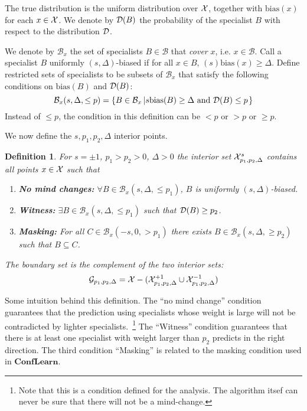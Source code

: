 \documentclass{article}
\newtheorem{definition}[theorem]{Definition}
\newcommand{\D}{{\cal D}}
\newcommand{\cB}{\mathcal{B}}
\newcommand{\cG}{\mathcal{G}}
\newcommand{\bias}{\text{bias}}
\newcommand{\ActiveLearn}{\mathbf{ConfLearn}}
\begin{document}
The true distribution is the uniform distribution over
${\cal X}$, together with $\bias(x)$ for each $x \in {\cal X}$. We denote by
$\D(B)$ the probability of the specialist $B$ with respect to the	
distribution $\D$.

\newcommand{\restricted}[2]{{#1}(#2)}

We denote by $\cB_x$ the set of specialists $B \in \cB$ that {\em
  cover} $x$, i.e. $x \in \cB$.
Call a specialist $B$ uniformly $(s,\Delta)$-biased if for all $x \in B$, $(s)\bias(x) \geq \Delta$.
Define restricted sets of specialists to be subsets of $\cB_x$ that
satisfy the following conditions on $\bias(B)$ and $\D(B)$:
\[ \restricted{\cB_x}{s,\Delta,\leq p}
=
\left\{
B \in \cB_{x} \left| s \bias(B) \geq \Delta \mbox{ and } \D(B) \leq p
\right.\right\}
\]
Instead of $\leq p$, the condition in this definition can be
$<p$ or $>p$ or $\geq p$.

We now define the $s,p_1,p_2,\Delta$ interior points.

\newcommand{\interior}[3]{{#1}^{#2}_{#3}}
\newcommand{\boundry}[1]{\cG_{#1}}
\begin{definition}
For $s = \pm 1$, $p_1>p_2>0$, $\Delta>0$ the {\em interior set}
$\interior{\all}{s}{p_1,p_2,\Delta}$ contains all points $x \in {\cal X}$ such that
\begin{enumerate}
\item {\bf No mind changes:} $\forall B \in
  \restricted{\cB_x}{s,\Delta,\leq p_1}$, $B$ is uniformly $(s,\Delta)$-biased.
\item {\bf Witness:} $\exists B \in \restricted{\cB_x}{s,\Delta,\leq p_1}$ such that $\D(B) \geq p_2$.
\item {\bf Masking:} For all $C \in \restricted{\cB_x}{-s,0,> p_1}$
  there exists $B \in \restricted{\cB_x}{s,\Delta,\geq p_2}$ such
  that $B \subseteq C$.
\end{enumerate}
The {\em boundary set} is the complement of the two interior sets:
$$\boundry{p_1,p_2,\Delta} = \all -
(\interior{\all}{+1}{p_1,p_2,\Delta} \cup
\interior{\all}{-1}{p_1,p_2,\Delta}) $$
\end{definition}

Some intuition behind this definition. The ``no mind change''
condition guarantees that the prediction using specialists whose
weight is large will not be contradicted by lighter
specialists.~\footnote{Note that this is a condition defined for the
  analysis. The algorithm itsef can never be sure that there will not
  be a mind-change.} The ``Witness'' condition
guarantees that there is at least one specialist with weight
larger than $p_2$ predicts in the right direction. The third condition
``Masking'' is related to the masking condition used in $\ActiveLearn$.
\end{document}
